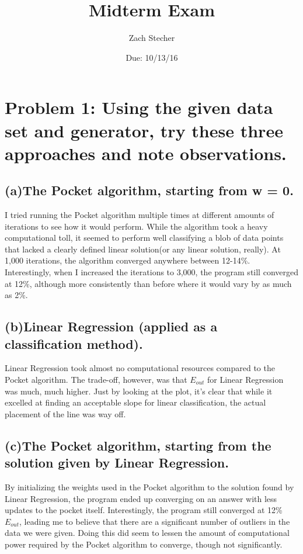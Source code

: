 \documentclass[11pt]{article}
\title{Midterm Exam}
\author{Zach Stecher}
\date{Due: 10/13/16}
\begin{document}
\lstset{language=Python}

\maketitle

\section*{Problem 1: Using the given data set and generator, try these three approaches and note observations.}

\subsection*{(a)The Pocket algorithm, starting from w = 0.}

I tried running the Pocket algorithm multiple times at different amounts of iterations to see how it would perform. While the algorithm took a heavy computational toll, it seemed to perform well classifying a blob of data points that lacked a clearly defined linear solution(or any linear solution, really). At 1,000 iterations, the algorithm converged anywhere between 12-14\%. Interestingly, when I increased the iterations to 3,000, the program still converged at 12\%, although more consistently than before where it would vary by as much as 2\%.

\subsection*{(b)Linear Regression (applied as a classification method).}

Linear Regression took almost no computational resources compared to the Pocket algorithm. The trade-off, however, was that $E_{out}$ for Linear Regression was much, much higher. Just by looking at the plot, it's clear that while it excelled at finding an acceptable slope for linear classification, the actual placement of the line was way off.
\newpage

\subsection*{(c)The Pocket algorithm, starting from the solution given by Linear Regression.}

By initializing the weights used in the Pocket algorithm to the solution found by Linear Regression, the program ended up converging on an answer with less updates to the pocket itself. Interestingly, the program still converged at 12\% $E_{out}$, leading me to believe that there are a significant number of outliers in the data we were given. Doing this did seem to lessen the amount of computational power required by the Pocket algorithm to converge, though not significantly.
\end{document}
